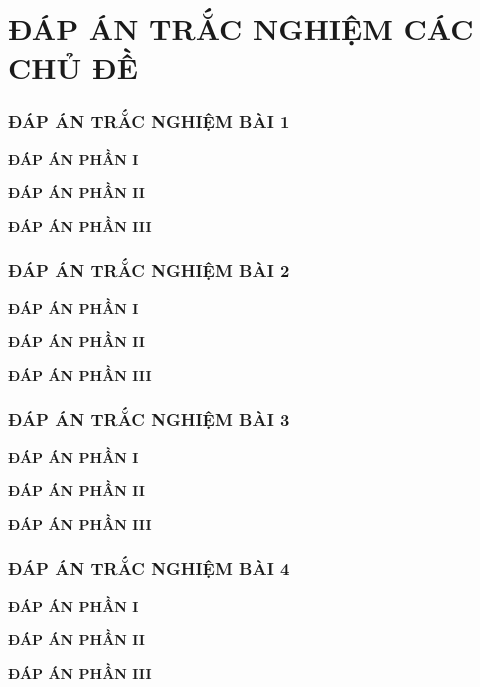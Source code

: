 \section*{ĐÁP ÁN TRẮC NGHIỆM CÁC CHỦ ĐỀ}
\subsubsection{ĐÁP ÁN TRẮC NGHIỆM BÀI 1}
\noindent\textbf{ĐÁP ÁN PHẦN I}

\noindent\textbf{ĐÁP ÁN PHẦN II}

\noindent\textbf{ĐÁP ÁN PHẦN III}


\subsubsection{ĐÁP ÁN TRẮC NGHIỆM BÀI 2}
\noindent\textbf{ĐÁP ÁN PHẦN I}

\noindent\textbf{ĐÁP ÁN PHẦN II}

\noindent\textbf{ĐÁP ÁN PHẦN III}

\subsubsection{ĐÁP ÁN TRẮC NGHIỆM BÀI 3}
\noindent\textbf{ĐÁP ÁN PHẦN I}

\noindent\textbf{ĐÁP ÁN PHẦN II}

\noindent\textbf{ĐÁP ÁN PHẦN III}
\subsubsection{ĐÁP ÁN TRẮC NGHIỆM BÀI 4}
\noindent\textbf{ĐÁP ÁN PHẦN I}

\noindent\textbf{ĐÁP ÁN PHẦN II}

\noindent\textbf{ĐÁP ÁN PHẦN III}
